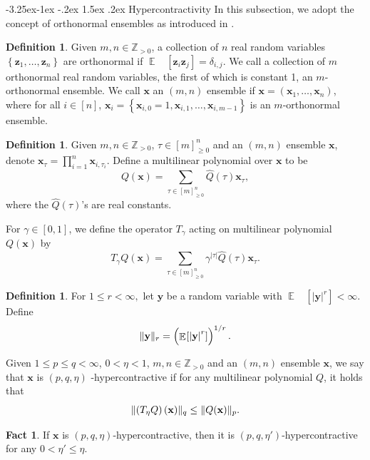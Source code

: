 \documentclass[11pt]{article}
\makeatletter
\renewcommand{\subsection}{\@startsection{subsection}{2}{\z@}%
             {-3.25ex\@plus -1ex \@minus -.2ex}%
             {1.5ex \@plus .2ex}%
             {\normalfont\large\scshape\bfseries}}
\theoremstyle{plain}
\theoremstyle{definition}
\newtheorem{definition}[theorem]{Definition}
\newtheorem{fact}[theorem]{Fact}
\newcommand {\minusspace} {\: \! \!}
\newcommand {\Fn} [2] {\ensuremath{ #1 \minusspace \Br{ #2 } }}
\newcommand {\set} [1] {\ensuremath{ \left\lbrace #1 \right\rbrace }}
\newcommand {\br} [1] {\ensuremath{ \left( #1 \right) }}
\newcommand {\Br} [1] {\ensuremath{ \left[ #1 \right] }}
\DeclarePairedDelimiter{\norm}{\lVert}{\rVert}
\newcommand {\ab} [1] {\ensuremath{ \left| #1 \right| }}
\DeclareMathOperator*{\bigE}{\mathbb{E}}
\newcommand {\expec} [2] {\Fn{\bigE_{\substack{#1}}}{#2}}
\newcommand{\posint}{{\mathbb Z}_{>0}}
\newcommand{\randz}{\ensuremath{\mathbf{z}}}
\newcommand{\randx}{\ensuremath{\mathbf{x}}}
\newcommand{\randy}{\ensuremath{\mathbf{y}}}
\newcommand{\1}{\mathbb{1}} %
\makeatother
\begin{document}
\subsection{Hypercontractivity}
In this subsection,  we adopt the concept of orthonormal ensembles as introduced in \cite{mossel2005noise}.
\begin{definition}
Given $m,n\in\posint$, a collection of $n$ real random variables $\set{\randz_1,\ldots,\randz_n}$ are orthonormal if $\expec{}{\randz_i\randz_j}=\delta_{i,j}$. We call a collection of $m$ orthonormal real random variables, the first of which is constant 1, an $m$-orthonormal ensemble. We call $\randx$ an $(m,n)$ ensemble if $\randx = (\randx_1,\dots ,\randx_n)$, where for all $i\in[n]$, $\randx_i = \set{\randx_{i,0} = 1,\randx_{i,1},\dots,\randx_{i,m-1}}$ is an $m$-orthonormal ensemble. 
\end{definition}

\begin{definition}\label{def:defofT}
Given $m,n\in\posint$, $\tau\in\Br{m}^n_{\geq0}$ and an $(m,n)$ ensemble $\randx$, denote $\randx_\tau=\prod_{i=1}^n\randx_{i,\tau_i}$. Define a multilinear polynomial over $\randx$ to be 
\[Q(\randx)=\sum_{\tau\in\Br{m}^n_{\geq0}}\widehat{Q}\br{\tau}\randx_\tau,\]
where the $\widehat{Q}\br{\tau}$'s are real constants. 

For $\gamma\in[0,1]$, we define the operator $T_\gamma$ acting on multilinear polynomial $Q(\randx)$ by 
\[T_\gamma Q(\randx)=\sum_{\tau\in\Br{m}^n_{\geq0}}\gamma^{\ab{\tau}}\widehat{Q}\br{\tau}\randx_\tau.\]

\end{definition}

\begin{definition}
For $1\leq r<\infty,$ let $\randy$ be a random variable with $\expec{}{\ab{\randy}^r}<\infty$. Define 
\[\norm{\randy}_r=\br{\expec{}{\ab{\randy}^r}}^{1/r}.\]

Given $1\leq p\leq q<\infty$, $0<\eta<1$, $m,n\in\posint$ and an $(m,n)$ ensemble  $\randx$, we say that $\randx$ is $(p,q,\eta)$ -hypercontractive if for any multilinear polynomial $Q$, it holds that 
\[\norm{\br{T_\eta Q}(\randx)}_q\leq\norm{Q(\randx)}_p.\]
\end{definition}

\begin{fact}\cite[Remark 3.10]{mossel2005noise}\label{fact:hc}
If $\randx$ is $(p,q,\eta)$-hypercontractive, then it is  $(p,q,\eta')$-hypercontractive for any $0<\eta' \leq\eta$.
\end{fact}
\end{document}
